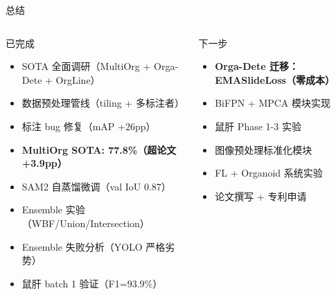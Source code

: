 \documentclass[aspectratio=169, 10pt]{beamer}
\begin{document}
\begin{frame}{总结}
  \begin{columns}[T]
    \begin{block}{已完成}
      \begin{itemize}
        \item[\checkmark] SOTA 全面调研（MultiOrg + Orga-Dete + OrgLine）
        \item[\checkmark] 数据预处理管线（tiling + 多标注者）
        \item[\checkmark] 标注 bug 修复（mAP +26pp）
        \item[\checkmark] \textbf{MultiOrg SOTA: 77.8\%（超论文 +3.9pp）}
        \item[\checkmark] SAM2 自蒸馏微调（val IoU 0.87）
        \item[\checkmark] Ensemble 实验（WBF/Union/Intersection）
        \item[\checkmark] Ensemble 失败分析（YOLO 严格劣势）
        \item[\checkmark] 鼠肝 batch 1 验证（F1=93.9\%）
      \end{itemize}
    \end{block}
    \begin{block}{下一步}
      \begin{itemize}
        \item[$\rightarrow$] \textbf{Orga-Dete 迁移：EMASlideLoss（零成本）}
        \item[$\rightarrow$] BiFPN + MPCA 模块实现
        \item[$\circ$] 鼠肝 Phase 1-3 实验
        \item[$\circ$] 图像预处理标准化模块
        \item[$\circ$] FL + Organoid 系统实验
        \item[$\circ$] 论文撰写 + 专利申请
      \end{itemize}
    \end{block}
  \end{columns}
\end{frame}
\end{document}
